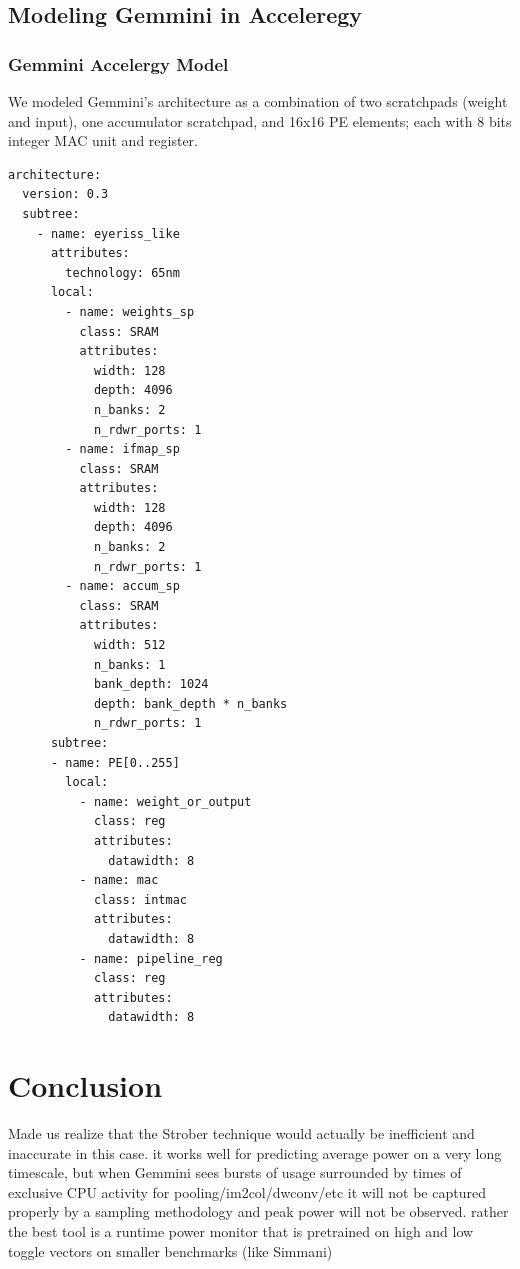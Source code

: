 \documentclass[sigconf]{acmart}
\begin{document}
\subsection{Modeling Gemmini in Acceleregy}
\subsubsection{Gemmini Accelergy Model}
We modeled Gemmini's architecture as a combination of two scratchpads (weight and input), one accumulator scratchpad, and 16x16 PE elements; each with 8 bits integer MAC unit and register.

\begin{verbatim}
architecture:
  version: 0.3
  subtree:
    - name: eyeriss_like
      attributes:
        technology: 65nm
      local:
        - name: weights_sp
          class: SRAM
          attributes:
            width: 128
            depth: 4096
            n_banks: 2
            n_rdwr_ports: 1
        - name: ifmap_sp
          class: SRAM
          attributes:
            width: 128
            depth: 4096
            n_banks: 2
            n_rdwr_ports: 1
        - name: accum_sp
          class: SRAM
          attributes:
            width: 512
            n_banks: 1
            bank_depth: 1024
            depth: bank_depth * n_banks
            n_rdwr_ports: 1
      subtree:
      - name: PE[0..255]
        local:
          - name: weight_or_output
            class: reg
            attributes:
              datawidth: 8
          - name: mac
            class: intmac
            attributes:
              datawidth: 8
          - name: pipeline_reg
            class: reg
            attributes:
              datawidth: 8
\end{verbatim}


\section{Conclusion}

Made us realize that the Strober technique would actually be inefficient and inaccurate in this case. it works well for predicting average power on a very long timescale, but when Gemmini sees bursts of usage surrounded by times of exclusive CPU activity for pooling/im2col/dwconv/etc it will not be captured properly by a sampling methodology and peak power will not be observed. rather the best tool is a runtime power monitor that is pretrained on high and low toggle vectors on smaller benchmarks (like Simmani)
\end{document}
